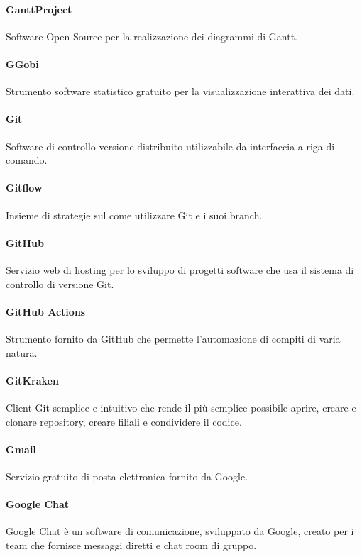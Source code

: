 \documentclass[]{article}
\begin{document}
	\paragraph*{GanttProject}
	Software Open Source per la realizzazione dei diagrammi di Gantt.

	\paragraph*{GGobi}
	Strumento software statistico gratuito per la visualizzazione interattiva dei dati.

	\paragraph*{Git}
	Software di controllo versione distribuito utilizzabile da interfaccia a riga di comando.

	\paragraph*{Gitflow}
	Insieme di strategie sul come utilizzare Git e i suoi branch.

	\paragraph*{GitHub}
	Servizio web di hosting per lo sviluppo di progetti software che usa il sistema di controllo di versione Git.

	\paragraph*{GitHub Actions}
	Strumento fornito da GitHub che permette l’automazione di compiti di varia natura.

	\paragraph*{GitKraken}
	Client Git semplice e intuitivo che rende il più semplice possibile aprire, creare e clonare repository, creare filiali e condividere il codice.

	\paragraph*{Gmail}
	Servizio gratuito di posta elettronica fornito da Google.

    \paragraph*{Google Chat}
    Google Chat è un software di comunicazione, sviluppato da Google, creato per i team che fornisce messaggi diretti e chat room di gruppo.
\end{document}

